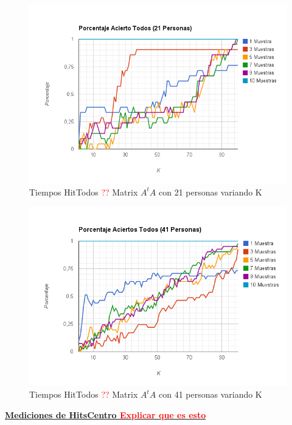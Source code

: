 \begin{figure}[H]
\includegraphics[width=1\textwidth]{img/imagek.png}
     \caption{Tiempos HitTodos \textcolor{red}{??} Matrix $A^tA$ con 21 personas variando K}
     \label{fig:figura1}
\end{figure}

\begin{figure}[H]
\includegraphics[width=1\textwidth]{img/imagel.png}
     \caption{Tiempos HitTodos \textcolor{red}{??} Matrix $A^tA$ con 41 personas variando K}
     \label{fig:figura1}
\end{figure}

\underline{\textbf{Mediciones de HitsCentro \textcolor{red}{Explicar que es esto}}}

